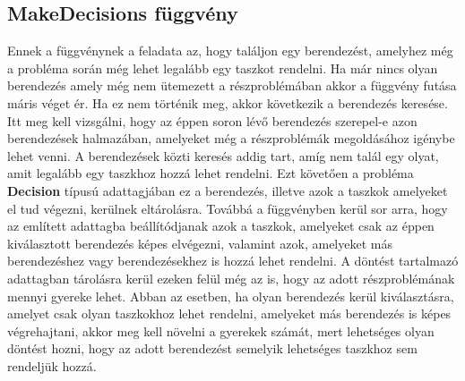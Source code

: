 \subsection{MakeDecisions függvény}
Ennek a függvénynek a feladata az, hogy találjon egy berendezést, amelyhez még a probléma során még lehet legalább egy taszkot rendelni. Ha már nincs olyan berendezés amely még nem ütemezett a részproblémában akkor a függvény futása máris véget ér. Ha ez nem történik meg, akkor következik a berendezés keresése. Itt meg kell vizsgálni, hogy az éppen soron lévő berendezés szerepel-e azon berendezések halmazában, amelyeket még a részproblémák megoldásához igénybe lehet venni. A berendezések közti keresés addig tart, amíg nem talál egy olyat, amit legalább egy taszkhoz hozzá lehet rendelni. Ezt követően a probléma \textbf{Decision} típusú adattagjában ez a berendezés, illetve azok a taszkok amelyeket el tud végezni, kerülnek eltárolásra. Továbbá a függvényben kerül sor arra, hogy az említett adattagba beállítódjanak azok a taszkok, amelyeket csak az éppen kiválasztott berendezés képes elvégezni, valamint azok, amelyeket más berendezéshez vagy berendezésekhez is hozzá lehet rendelni. A döntést tartalmazó adattagban tárolásra kerül ezeken felül még az is, hogy az adott részproblémának mennyi gyereke lehet. Abban az esetben, ha olyan berendezés kerül kiválasztásra, amelyet csak olyan taszkokhoz lehet rendelni, amelyeket más berendezés is képes végrehajtani, akkor meg kell növelni a gyerekek számát, mert lehetséges olyan döntést hozni, hogy az adott berendezést semelyik lehetséges taszkhoz sem rendeljük hozzá.   
